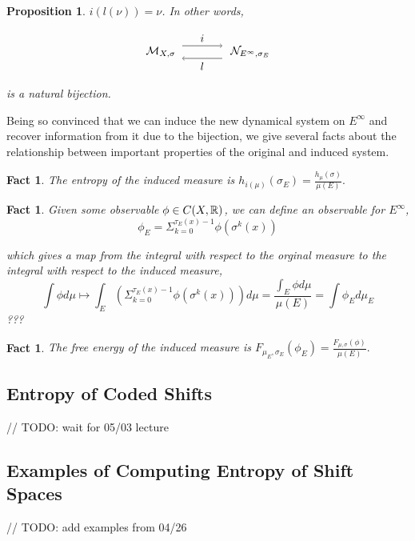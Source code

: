 \documentclass[11pt, reqno]{amsart}
\theoremstyle{plain}
\numberwithin{thm}{subsection}
\newtheorem{prop}[thm]{Proposition}
\newtheorem{fact}[thm]{Fact}
\theoremstyle{definition}
\begin{document}
\begin{prop}
  $i(l(\nu)) = \nu$. In other words,
  \begin{figure}[H]
    \centering 
    $$\begin{tikzpicture}
      \node (A) at (-1.3, 0)   {$\cM_{X, \sigma}$};
      \node (B) at (1.5, 0)    {$\cN_{E^\infty, \sigma_E}$};
      \node (C) at (-.75, .2)  {};
      \node (D) at (.75, -.2) {};
      \node (E) at (.75, .2)   {};
      \node (F) at (-.75,-.2)  {};
        
      \draw[->] (C) -- node[above] {$i$}      (E);
      \draw[<-] (F) -- node[below] {$l$} (D);
    \end{tikzpicture}$$ 
  \end{figure}
  is a natural bijection.
\end{prop}

Being so convinced that we can induce the new dynamical system on $E^\infty$ and recover information from it due to the bijection, we give several facts about the relationship between important properties of the original and induced system.

\begin{fact}
  The entropy of the induced measure is $h_{i(\mu)}(\sigma_E) = \frac{h_\mu(\sigma)}{\mu(E)}.$
\end{fact}

\begin{fact}
  Given some observable $\phi \in C(X, \mathbb{R})$, we can define an observable for $E^\infty$,
  $$\phi_E = \Sigma_{k=0}^{\tau_E(x)-1}\phi(\sigma^k(x))$$

  which gives a map from the integral with respect to the orginal measure to the integral with respect to the induced measure, 
  $$\int\phi d\mu \mapsto \int_E \left(\Sigma_{k=0}^{\tau_E(x)-1}\phi(\sigma^k(x))\right)d\mu = \frac{\int_E \phi d\mu}{\mu(E)} = \int\phi_E d\mu_E$$
  ???
\end{fact}
\begin{fact}
  The free energy of the induced measure is $F_{\mu_E, \sigma_E}(\phi_E) = \frac{F_{\mu, \sigma}(\phi)}{\mu(E)}.$
\end{fact}


\subsection{Entropy of Coded Shifts}\cite[L12]{wolf}
// TODO: wait for 05/03 lecture

\subsection{Examples of Computing Entropy of Shift Spaces}
// TODO: add examples from 04/26
\end{document}

